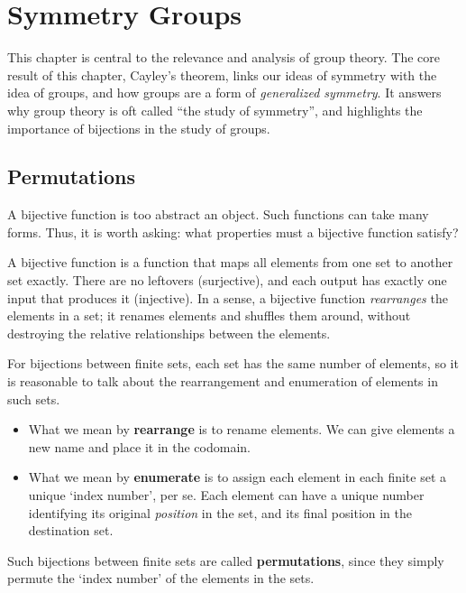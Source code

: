 \chapter{Symmetry Groups}
This chapter is central to the relevance and analysis of group theory. The core result of this chapter, Cayley's theorem, links our ideas of symmetry with the idea of groups, and how groups are a form of \textit{generalized symmetry}. It answers why group theory is oft called ``the study of symmetry'', and highlights the importance of bijections in the study of groups.

\section{Permutations}
A bijective function is too abstract an object. Such functions can take many forms. Thus, it is worth asking: what properties must a bijective function satisfy?

A bijective function is a function that maps all elements from one set to another set exactly. There are no leftovers (surjective), and each output has exactly one input that produces it (injective). In a sense, a bijective function \textit{rearranges} the elements in a set; it renames elements and shuffles them around, without destroying the relative relationships between the elements.

For bijections between finite sets, each set has the same number of elements, so it is reasonable to talk about the rearrangement and enumeration of elements in such sets.
\begin{itemize}
    \item What we mean by \textbf{rearrange} is to rename elements. We can give elements a new name and place it in the codomain.
    \item What we mean by \textbf{enumerate} is to assign each element in each finite set a unique `index number', per se. Each element can have a unique number identifying its original \textit{position} in the set, and its final position in the destination set.
\end{itemize}

Such bijections between finite sets are called \textbf{permutations}, since they simply permute the `index number' of the elements in the sets.

